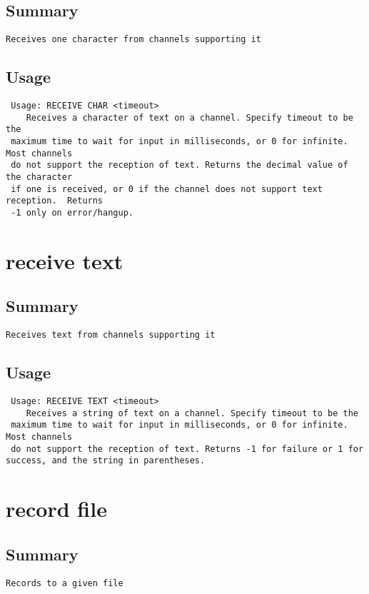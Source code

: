 \subsection{Summary}
\begin{verbatim}
Receives one character from channels supporting it
\end{verbatim}
\subsection{Usage}
\begin{verbatim}
 Usage: RECEIVE CHAR <timeout>
	Receives a character of text on a channel. Specify timeout to be the
 maximum time to wait for input in milliseconds, or 0 for infinite. Most channels
 do not support the reception of text. Returns the decimal value of the character
 if one is received, or 0 if the channel does not support text reception.  Returns
 -1 only on error/hangup.

\end{verbatim}


\section{receive text}
\subsection{Summary}
\begin{verbatim}
Receives text from channels supporting it
\end{verbatim}
\subsection{Usage}
\begin{verbatim}
 Usage: RECEIVE TEXT <timeout>
	Receives a string of text on a channel. Specify timeout to be the
 maximum time to wait for input in milliseconds, or 0 for infinite. Most channels
 do not support the reception of text. Returns -1 for failure or 1 for success, and the string in parentheses.

\end{verbatim}


\section{record file}
\subsection{Summary}
\begin{verbatim}
Records to a given file
\end{verbatim}
